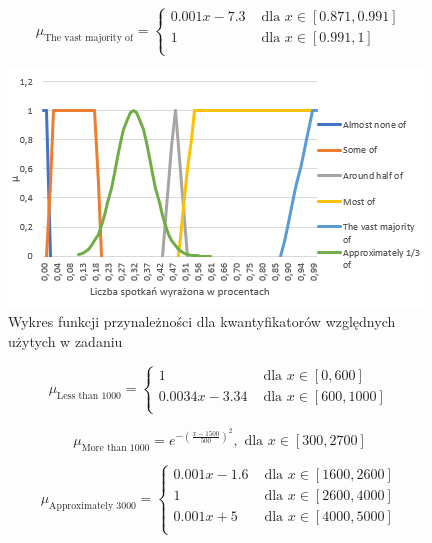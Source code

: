 \documentclass{classrep}
\begin{document}
  \begin{equation}
    \mu_{\text{The vast majority of}} =
      \begin{cases}
        0.001x - 7.3 & \text{ dla } x \in [0.871,0.991] \\
        1 & \text{ dla } x \in [0.991,1] \\
      \end{cases}  
  \end{equation}
  
 \begin{figure}[H]
 \centering
   \includegraphics{wzgledne.png}
   \caption{Wykres funkcji przynależności dla kwantyfikatorów względnych użytych w zadaniu}
 \end{figure}

  
 \begin{equation}
  \mu_{\text{Less than 1000}} =
    \begin{cases}
      1 & \text{ dla } x \in [0,600] \\
      0.0034x - 3.34 & \text{ dla } x \in [600,1000] \\
    \end{cases}  
\end{equation}

\begin{equation}
  \mu_{\text{More than 1000}} = e^{-(\frac{x-1500}{500})^2}, \text{ dla } x \in [300,2700]
\end{equation}

\begin{equation}
  \mu_{\text{Approximately 3000}} =
    \begin{cases}
      0.001x - 1.6 & \text{ dla } x \in [1600,2600] \\
      1 & \text{ dla } x \in [2600,4000] \\
      0.001x +5 & \text{ dla } x \in [4000,5000] \\
    \end{cases}  
\end{equation}
\end{document}
